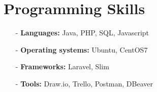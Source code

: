 \documentclass[letterpaper, 11pt]{article}
\begin{document}
\section{Programming Skills}
\begin{minipage}[t]{0.5\textwidth}
  \begin{itemize}[leftmargin=*]
    \item[-] \textbf{Languages:} Java, PHP, SQL, Javascript
    \item[-] \textbf{Operating systems:} Ubuntu, CentOS7
  \end{itemize}
\end{minipage}%
\begin{minipage}[t]{0.5\textwidth}
  \begin{itemize}[leftmargin=*]
    \item[-] \textbf{Frameworks:} Laravel, Slim
    \item[-] \textbf{Tools:} Draw.io, Trello, Postman, DBeaver
  \end{itemize}
\end{minipage}

\end{document}
